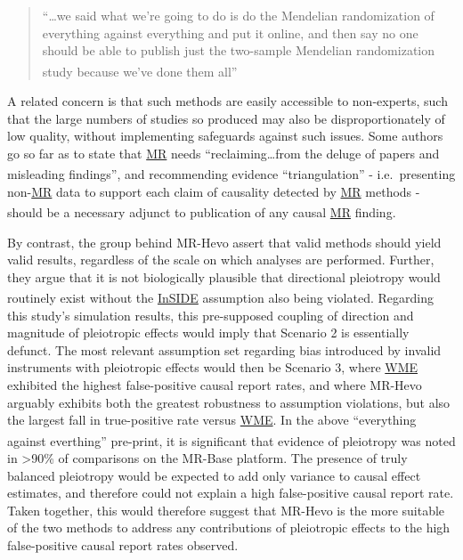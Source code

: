 \documentclass[
]{article}
\begin{document}
\begin{quote}
``\ldots we said what we're going to do is do the Mendelian randomization of everything against everything and put it online, and then say no one should be able to publish just the two-sample Mendelian randomization study because we've done them all''\textsuperscript{}
\end{quote}

A related concern is that such methods are easily accessible to non-experts, such that the large numbers of studies so produced may also be disproportionately of low quality, without implementing safeguards against such issues. Some authors go so far as to state that \hyperref[acronyms_MR]{MR} needs ``reclaiming\ldots from the deluge of papers and misleading findings''\textsuperscript{}, and recommending evidence ``triangulation'' - i.e.~presenting non-\hyperref[acronyms_MR]{MR} data to support each claim of causality detected by \hyperref[acronyms_MR]{MR} methods - should be a necessary adjunct to publication of any causal \hyperref[acronyms_MR]{MR} finding\textsuperscript{}.

By contrast, the group behind MR-Hevo assert that valid methods should yield valid results, regardless of the scale on which analyses are performed. Further, they argue that it is not biologically plausible that directional pleiotropy would routinely exist without the \hyperref[acronyms_InSIDE]{InSIDE} assumption also being violated\textsuperscript{}. Regarding this study's simulation results, this pre-supposed coupling of direction and magnitude of pleiotropic effects would imply that Scenario 2 is essentially defunct. The most relevant assumption set regarding bias introduced by invalid instruments with pleiotropic effects would then be Scenario 3, where \hyperref[acronyms_WME]{WME} exhibited the highest false-positive causal report rates, and where MR-Hevo arguably exhibits both the greatest robustness to assumption violations, but also the largest fall in true-positive rate versus \hyperref[acronyms_WME]{WME}. In the above ``everything against everthing'' pre-print\textsuperscript{}, it is significant that evidence of pleiotropy was noted in \textgreater90\% of comparisons on the MR-Base platform. The presence of truly balanced pleiotropy would be expected to add only variance to causal effect estimates, and therefore could not explain a high false-positive causal report rate. Taken together, this would therefore suggest that MR-Hevo is the more suitable of the two methods to address any contributions of pleiotropic effects to the high false-positive causal report rates observed.
\end{document}
